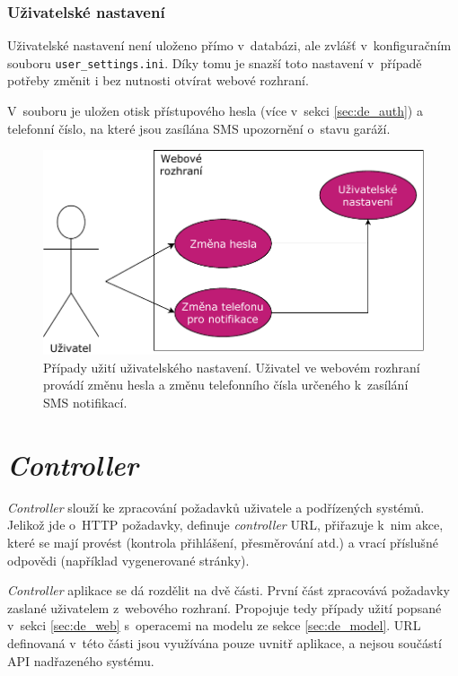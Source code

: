 \subsubsection{Uživatelské nastavení}
\label{sec:de_user_settings}

Uživatelské nastavení není uloženo přímo v~databázi, ale zvlášť v~konfiguračním souboru \texttt{user\_settings.ini}. Díky tomu je snazší toto nastavení v~případě potřeby změnit i bez nutnosti otvírat webové rozhraní.

V~souboru je uložen otisk přístupového hesla (více v~sekci \ref{sec:de_auth}) a telefonní číslo, na které jsou zasílána SMS upozornění o~stavu garáží.

\begin{figure}[h!]
    \centering
    \includegraphics[width=\textwidth]{images/use_case_user.pdf}
    \caption[Případy užití uživatelského nastavení]{Případy užití uživatelského nastavení. Uživatel ve webovém rozhraní provádí změnu hesla a změnu telefonního čísla určeného k~zasílání SMS notifikací.}
    \label{fig:use_case_user}
\end{figure}


\section{\textit{Controller}}
\label{sec:de_controller}

\textit{Controller} slouží ke zpracování požadavků uživatele a podřízených systémů. Jelikož jde o~HTTP požadavky, definuje \textit{controller} URL, přiřazuje k~nim akce, které se mají provést (kontrola přihlášení, přesměrování atd.) a vrací příslušné odpovědi (například vygenerované stránky).

\textit{Controller} aplikace se dá rozdělit na dvě části. První část zpracovává požadavky zaslané uživatelem z~webového rozhraní. Propojuje tedy případy užití popsané v~sekci \ref{sec:de_web} s~operacemi na modelu ze sekce \ref{sec:de_model}. URL definovaná v~této části jsou využívána pouze uvnitř aplikace, a nejsou součástí API nadřazeného systému.

